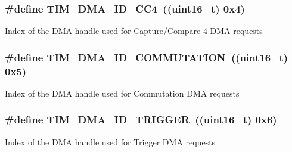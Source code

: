 \subsubsection[{\texorpdfstring{T\+I\+M\+\_\+\+D\+M\+A\+\_\+\+I\+D\+\_\+\+C\+C4}{TIM_DMA_ID_CC4}}]{\setlength{\rightskip}{0pt plus 5cm}\#define T\+I\+M\+\_\+\+D\+M\+A\+\_\+\+I\+D\+\_\+\+C\+C4~((uint16\+\_\+t) 0x4)}\hypertarget{group___d_m_a___handle__index_ga1860c00b370435ff40d9e65f14a61706}{}\label{group___d_m_a___handle__index_ga1860c00b370435ff40d9e65f14a61706}
Index of the D\+MA handle used for Capture/\+Compare 4 D\+MA requests 
\subsubsection[{\texorpdfstring{T\+I\+M\+\_\+\+D\+M\+A\+\_\+\+I\+D\+\_\+\+C\+O\+M\+M\+U\+T\+A\+T\+I\+ON}{TIM_DMA_ID_COMMUTATION}}]{\setlength{\rightskip}{0pt plus 5cm}\#define T\+I\+M\+\_\+\+D\+M\+A\+\_\+\+I\+D\+\_\+\+C\+O\+M\+M\+U\+T\+A\+T\+I\+ON~((uint16\+\_\+t) 0x5)}\hypertarget{group___d_m_a___handle__index_gaa707c98bb11277665635ca7aef1e4193}{}\label{group___d_m_a___handle__index_gaa707c98bb11277665635ca7aef1e4193}
Index of the D\+MA handle used for Commutation D\+MA requests 
\subsubsection[{\texorpdfstring{T\+I\+M\+\_\+\+D\+M\+A\+\_\+\+I\+D\+\_\+\+T\+R\+I\+G\+G\+ER}{TIM_DMA_ID_TRIGGER}}]{\setlength{\rightskip}{0pt plus 5cm}\#define T\+I\+M\+\_\+\+D\+M\+A\+\_\+\+I\+D\+\_\+\+T\+R\+I\+G\+G\+ER~((uint16\+\_\+t) 0x6)}\hypertarget{group___d_m_a___handle__index_ga39900e5227e4d813a726a1df5d86671c}{}\label{group___d_m_a___handle__index_ga39900e5227e4d813a726a1df5d86671c}
Index of the D\+MA handle used for Trigger D\+MA requests 
